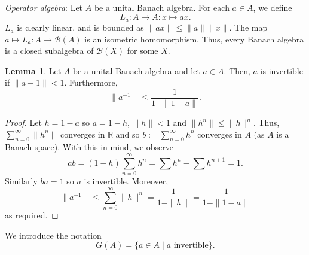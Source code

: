 \documentclass[]{article}
\theoremstyle{definition}
\newtheorem{lemma}{Lemma}[section]
\begin{document}
\textit{Operator algebra}: Let \(A\) be a unital Banach algebra. For each \(a \in A\), we define 
\[L_a : A \to A: x \mapsto ax.\]
\(L_a\) is clearly linear, and is bounded as \(\|ax\| \le \|a\|\|x\|\). The map 
\(a \mapsto L_a : A \to \mathcal{B}(A)\) is an isometric homomorphism. Thus, every Banach algebra 
is a closed subalgebra of \(\mathcal{B}(X)\) for some \(X\). 

\begin{lemma}
  Let \(A\) be a unital Banach algebra and let \(a \in A\). Then, \(a\) is invertible if \(\|a - 1\| < 1\).
  Furthermore, 
  \[\|a^{-1}\| \le \frac{1}{1 - \|1 - a\|}.\]
\end{lemma}
\begin{proof}
  Let \(h = 1 - a\) so \(a = 1 - h\), \(\|h\| < 1\) and \(\|h^n\| \le \|h\|^n\). Thus, 
  \(\sum_{n = 0}^\infty \|h^n\|\) converges in \(\mathbb{R}\) and so \(b := \sum_{n = 0}^\infty h^n\) 
  converges in \(A\) (as \(A\) is a Banach space). With this in mind, we observe 
  \[ab = (1 - h)\sum_{n = 0}^\infty h^n = \sum h^n - \sum h^{n + 1} = 1.\]
  Similarly \(ba = 1\) so \(a\) is invertible. Moreover, 
  \[\|a^{-1}\| \le \sum_{n = 0}^\infty \|h\|^n = \frac{1}{1 - \|h\|} = \frac{1}{1 - \|1 - a\|}\]
  as required.
\end{proof}

We introduce the notation 
\[G(A) = \{a \in A \mid a \text{ invertible}\}.\]
\end{document}
